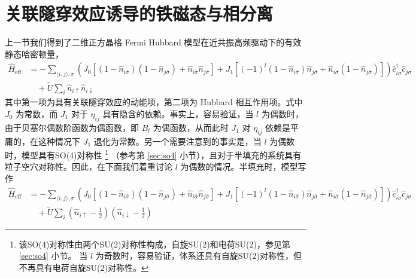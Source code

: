 \section{关联隧穿效应诱导的铁磁态与相分离} \label{sec:floqhubb}

上一节我们得到了二维正方晶格 Fermi Hubbard 模型在近共振高频驱动下的有效静态哈密顿量，
\begin{align}
\hat{H}_{\text{eff}} &= - \sum_{\langle i,j\rangle, \sigma} 
\left(J_0[(1-\hat{n}_{i\bar\sigma})(1-\hat{n}_{j\bar\sigma}) + \hat{n}_{i\bar\sigma}\hat{n}_{j\bar\sigma}]
+J_1[(-1)^l(1-\hat{n}_{i\bar\sigma})\hat{n}_{j\bar\sigma} + \hat{n}_{i\bar\sigma}(1-\hat{n}_{j\bar\sigma})]\right)
\hat{c}_{i\sigma}^{\dagger}\hat{c}_{j\sigma} \nonumber\\
& \quad + \tilde{U}\sum_{i}\hat{n}_{i\uparrow}\hat{n}_{i\downarrow}
\end{align}
其中第一项为具有关联隧穿效应的动能项，第二项为 Hubbard 相互作用项。式中 $J_0$ 为常数，而 $J_1$ 对于 $\eta_{ij}$ 具有隐含的依赖。事实上，容易验证，当 $l$ 为偶数时，由于贝塞尔偶数阶函数为偶函数，即 $B_l$ 为偶函数，从而此时 $J_1$ 对 $\eta_{ij}$ 依赖是平庸的，在这种情况下 $J_1$ 退化为常数。另一个需要注意到的事实是，当 $l$ 为偶数时，模型具有SO(4)对称性
\footnote{该SO(4)对称性由两个SU(2)对称性构成，自旋SU(2)和电荷SU(2)，参见第 \ref{sec:so4} 小节。 当 $l$ 为奇数时，容易验证，体系还具有自旋SU(2)对称性，但不再具有电荷自旋SU(2)对称性。}
（参考第 \ref{sec:so4} 小节），且对于半填充的系统具有粒子空穴对称性。因此，在下面我们着重讨论 $l$ 为偶数的情况。半填充时，模型写作
\begin{align}
\hat{H}_{\text{eff}} &= - \sum_{\langle i,j\rangle, \sigma} 
\left(J_0[(1-\hat{n}_{i\bar\sigma})(1-\hat{n}_{j\bar\sigma}) + \hat{n}_{i\bar\sigma}\hat{n}_{j\bar\sigma}]
+J_1[(-1)^l(1-\hat{n}_{i\bar\sigma})\hat{n}_{j\bar\sigma} + \hat{n}_{i\bar\sigma}(1-\hat{n}_{j\bar\sigma})]\right)
\hat{c}_{i\sigma}^{\dagger}\hat{c}_{j\sigma} \nonumber\\
& \quad + \tilde{U}\sum_{i}\left(\hat{n}_{i\uparrow}-\frac{1}{2}\right)\left(\hat{n}_{i\downarrow}-\frac{1}{2}\right)
\end{align}


